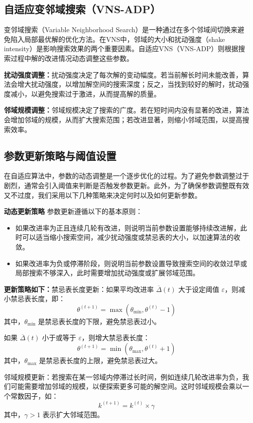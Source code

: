 \documentclass[12pt,a4paper,twoside]{ctexbook}
\begin{document}
\subsection{自适应变邻域搜索（VNS-ADP）}
变邻域搜索（Variable Neighborhood Search）是一种通过在多个邻域间切换来避免陷入局部最优解的优化方法。在VNS中，邻域的大小和扰动强度（shake intensity）是影响搜索效果的两个重要因素。自适应VNS（VNS-ADP）则根据搜索过程中解的改进情况动态调整这些参数。

\textbf{扰动强度调整：}扰动强度决定了每次解的变动幅度。若当前解长时间未能改善，算法会增大扰动强度，以增加解空间的搜索深度；反之，当找到较好的解时，扰动强度减小，以避免搜索过于激进，从而提高解的质量。

\textbf{邻域规模调整：}邻域规模决定了搜索的广度。若在短时间内没有显著的改进，算法会增加邻域的规模，从而扩大搜索范围；若改进显著，则缩小邻域范围，以提高搜索效率。


\subsection{参数更新策略与阈值设置}
在自适应算法中，参数的动态调整是一个逐步优化的过程。为了避免参数调整过于剧烈，通常会引入阈值来判断是否触发参数更新。此外，为了确保参数调整既有效又不过度，我们采用以下几种策略来决定何时以及如何更新参数。

\textbf{动态更新策略}
参数更新遵循以下的基本原则：
\begin{itemize}
    \item 如果改进率为正且连续几轮有改进，则说明当前参数设置能够持续改进解，此时可以适当缩小搜索空间，减少扰动强度或禁忌表的大小，以加速算法的收敛。
    \item 如果改进率为负或停滞阶段，则说明当前参数设置导致搜索空间的收敛过早或局部搜索不够深入，此时需要增加扰动强度或扩展邻域范围。
\end{itemize}

\textbf{更新策略如下：}禁忌表长度更新：如果平均改进率 $\overline{\Delta}(t)$ 大于设定阈值 $\varepsilon$，则减小禁忌表长度，即：
\[
\theta^{(t+1)} = \max(\theta_{\min}, \theta^{(t)} - 1)
\]
其中，$\theta_{\min}$ 是禁忌表长度的下限，避免禁忌表过小。

如果 $\overline{\Delta}(t)$ 小于或等于 $\varepsilon$，则增大禁忌表长度：
\[
\theta^{(t+1)} = \min(\theta_{\max}, \theta^{(t)} + 1)
\]
其中，$\theta_{\max}$ 是禁忌表长度的上限，避免禁忌表过大。

邻域规模更新：若搜索在某一邻域内停滞过长时间，例如连续几轮改进率为负，我们可能需要增加邻域的规模，以便探索更多可能的解空间。这时邻域规模会乘以一个常数因子，如：
\[
k^{(t+1)} = k^{(t)} \times \gamma
\]
其中，$\gamma > 1$ 表示扩大邻域范围。
\end{document}
